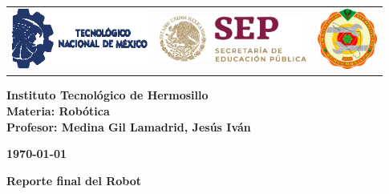 \begin{titlepage}
	\centering
	\begin{tabular}{@{}p{} p{} p{}@{}}
		\includegraphics[height=2cm]{tecnm} & 
		\centering \includegraphics[height=1.5cm]{SEP} & 
		\raggedleft \includegraphics[height=2cm]{ith.jpg} \\
	\end{tabular}
	
	\vspace{2em}
	
	\noindent
	\begin{minipage}[t]{0.6\textwidth}
		\raggedright
		\small \textbf{%
			Instituto Tecnológico de Hermosillo\\
			Materia: Robótica\\
			Profesor: Medina Gil Lamadrid, Jesús Iván%
		}
	\end{minipage}%
	\hfill
	\begin{minipage}[t]{0.3\textwidth}
		\raggedleft
		\small \textbf{\today}
	\end{minipage}
	
	\vspace{2em}
	
	{\Huge \textbf{Reporte final del Robot}}
		
	\vspace{1em}
	

\end{titlepage}
